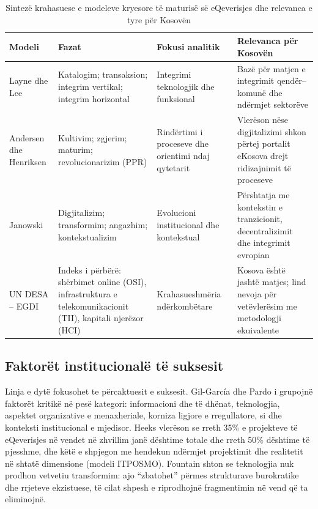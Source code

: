 \documentclass[conference]{IEEEtran}
\begin{document}
\begin{table}[t]
\caption{Sintezë krahasuese e modeleve kryesore të maturisë së eQeverisjes
dhe relevanca e tyre për Kosovën}
\label{tab:modelet}
\centering
\footnotesize
\renewcommand{\arraystretch}{1.25}
\begin{tabular}{>{\raggedright\arraybackslash}p{2.5cm}
                >{\raggedright\arraybackslash}p{4.3cm}
                >{\raggedright\arraybackslash}p{3.6cm}
                >{\raggedright\arraybackslash}p{5.2cm}}
\toprule
\textbf{Modeli} & \textbf{Fazat} & \textbf{Fokusi analitik} &
\textbf{Relevanca për Kosovën} \\
\midrule
Layne dhe Lee \cite{layne2001} &
Katalogim; transaksion; integrim vertikal; integrim horizontal &
Integrimi teknologjik dhe funksional &
Bazë për matjen e integrimit qendër--komunë dhe ndërmjet sektorëve \\
Andersen dhe Henriksen \cite{andersen2006} &
Kultivim; zgjerim; maturim; revolucionarizim (PPR) &
Rindërtimi i proceseve dhe orientimi ndaj qytetarit &
Vlerëson nëse digjitalizimi shkon përtej portalit eKosova drejt
ridizajnimit të proceseve \\
Janowski \cite{janowski2015} &
Digjitalizim; transformim; angazhim; kontekstualizim &
Evolucioni institucional dhe kontekstual &
Përshtatja me kontekstin e tranzicionit, decentralizimit dhe integrimit
evropian \\
UN DESA -- EGDI \cite{undesa2024} &
Indeks i përbërë: shërbimet online (OSI), infrastruktura e
telekomunikacionit (TII), kapitali njerëzor (HCI) &
Krahasueshmëria ndërkombëtare &
Kosova është jashtë matjes; lind nevoja për vetëvlerësim me metodologji
ekuivalente \\
\bottomrule
\end{tabular}
\end{table}

\subsection{Faktorët institucionalë të suksesit}
Linja e dytë fokusohet te përcaktuesit e suksesit. Gil-García dhe Pardo
\cite{gilgarcia2005} i grupojnë faktorët kritikë në pesë kategori:
informacioni dhe të dhënat, teknologjia, aspektet organizative e
menaxheriale, korniza ligjore e rregullatore, si dhe konteksti
institucional e mjedisor. Heeks \cite{heeks2003} vlerëson se rreth 35\% e
projekteve të eQeverisjes në vendet në zhvillim janë dështime totale dhe
rreth 50\% dështime të pjesshme, dhe këtë e shpjegon me hendekun ndërmjet
projektimit dhe realitetit në shtatë dimensione (modeli ITPOSMO). Fountain
\cite{fountain2001} shton se teknologjia nuk prodhon vetvetiu transformim:
ajo ``zbatohet'' përmes strukturave burokratike dhe rrjeteve ekzistuese, të
cilat shpesh e riprodhojnë fragmentimin në vend që ta eliminojnë.
\end{document}
